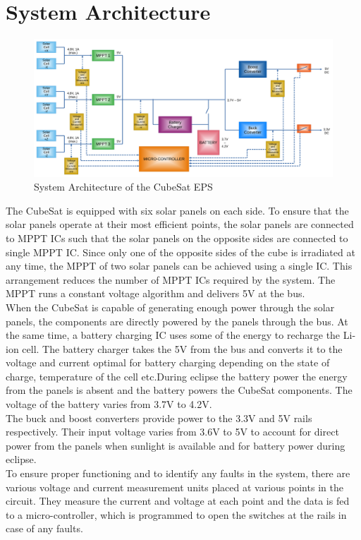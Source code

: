 \chapter{System Architecture}

\begin{figure}[h]
	\centering
	\includegraphics[width=\columnwidth]{diag1.pdf}
	\caption{System Architecture of the CubeSat EPS}
	\label{fig:arch}
\end{figure} 

The CubeSat is equipped with six solar panels on each side. To ensure that the solar panels operate at their most efficient points, the solar panels are connected to MPPT ICs such that the solar panels on the opposite sides are connected to single MPPT IC. Since only one of the opposite sides of the cube is irradiated at any time, the MPPT of two solar panels can be achieved using a single IC. This arrangement reduces the number of MPPT ICs required by the system. The MPPT runs a constant voltage algorithm and delivers 5V at the bus. 
\\

When the CubeSat is capable of generating enough power through the solar panels, the components are directly powered by the panels through the bus. At the same time, a battery charging IC uses some of the energy to recharge the Li-ion cell. The battery charger takes the 5V from the bus and converts it to the voltage and current optimal for battery charging depending on the state of charge, temperature of the cell etc.During eclipse the battery power the energy from the panels is absent and the battery powers the CubeSat components. The voltage of the battery varies from 3.7V to 4.2V.
\\

The buck and boost converters provide power to the 3.3V and 5V rails respectively. Their input voltage varies from 3.6V to 5V to account for direct power from the panels when sunlight is available and for battery power during eclipse.
\\

To ensure proper functioning and to identify any faults in the system, there are various voltage and current measurement units placed at various points in the circuit. They measure the current and voltage at each point and the data is fed to a micro-controller, which is programmed to open the switches at the rails in case of any faults.